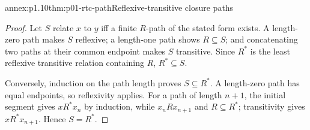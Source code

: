\begin{annexitem}{annex:p1.10}{thm:p01-rtc-path}{Reflexive-transitive closure paths}
\begin{proof}
Let \(S\) relate \(x\) to \(y\) iff a finite \(R\)-path of the stated form
exists.  A length-zero path makes \(S\) reflexive; a length-one path shows
\(R\subseteq S\); and concatenating two paths at their common endpoint makes
\(S\) transitive.  Since \(R^*\) is the least reflexive transitive relation
containing \(R\), \(R^*\subseteq S\).

Conversely, induction on the path length proves \(S\subseteq R^*\).  A
length-zero path has equal endpoints, so reflexivity applies.  For a path of
length \(n+1\), the initial segment gives \(xR^*x_n\) by induction, while
\(x_nRx_{n+1}\) and \(R\subseteq R^*\); transitivity gives
\(xR^*x_{n+1}\).  Hence \(S=R^*\).
\end{proof}
\end{annexitem}
